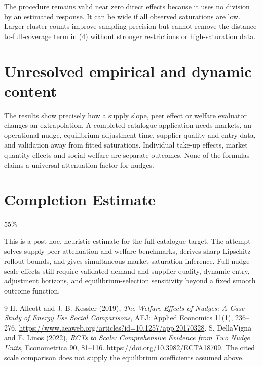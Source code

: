 \documentclass[11pt,a4paper]{article}
\begin{document}
The procedure remains valid near zero direct effects because it uses no division by an estimated response. It can be wide if all observed saturations are low. Larger cluster counts improve sampling precision but cannot remove the distance-to-full-coverage term in (4) without stronger restrictions or high-saturation data.

\section{Unresolved empirical and dynamic content}
The results show precisely how a supply slope, peer effect or welfare evaluator changes an extrapolation. A completed catalogue application needs markets, an operational nudge, equilibrium adjustment time, supplier quality and entry data, and validation away from fitted saturations. Individual take-up effects, market quantity effects and social welfare are separate outcomes. None of the formulas claims a universal attenuation factor for nudges.

\section{Completion Estimate}
55\%

This is a post hoc, heuristic estimate for the full catalogue target.
The attempt solves supply-peer attenuation and welfare benchmarks, derives sharp Lipschitz rollout bounds, and gives simultaneous market-saturation inference. Full nudge-scale effects still require validated demand and supplier quality, dynamic entry, adjustment horizons, and equilibrium-selection sensitivity beyond a fixed smooth outcome function.

\begin{thebibliography}{9}
 H. Allcott and J. B. Kessler (2019), \emph{The Welfare Effects of Nudges: A Case Study of Energy Use Social Comparisons}, AEJ: Applied Economics 11(1), 236--276. \url{https://www.aeaweb.org/articles?id=10.1257/app.20170328}.
 S. DellaVigna and E. Linos (2022), \emph{RCTs to Scale: Comprehensive Evidence from Two Nudge Units}, Econometrica 90, 81--116. \url{https://doi.org/10.3982/ECTA18709}. The cited scale comparison does not supply the equilibrium coefficients assumed above.
\end{thebibliography}
\end{document}
